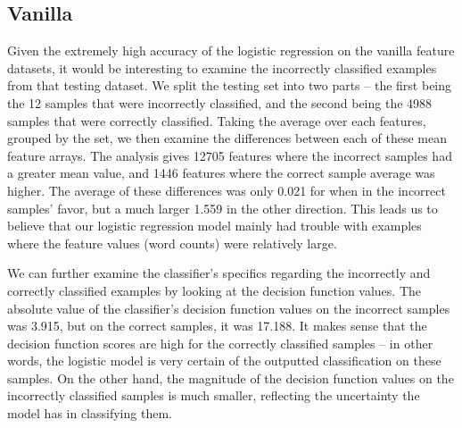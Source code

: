 \documentclass{article} %
\begin{document}
\subsection{Vanilla}
Given the extremely high accuracy of the logistic regression on the vanilla feature datasets, it would be interesting to examine the incorrectly classified examples from that testing dataset.  We split the testing set into two parts -- the first being the 12 samples that were incorrectly classified, and the second being the 4988 samples that were correctly classified.  Taking the average over each features, grouped by the set, we then examine the differences between each of these mean feature arrays.  The analysis gives 12705 features where the incorrect samples had a greater mean value, and 1446 features where the correct sample average was higher.  The average of these differences was only 0.021 for when in the incorrect samples' favor, but a much larger 1.559 in the other direction.  This leads us to believe that our logistic regression model mainly had trouble with examples where the feature values (word counts) were relatively large.\par 
We can further examine the classifier's specifics regarding the incorrectly and correctly classified examples by looking at the decision function values.  The absolute value of the classifier's decision function values on the incorrect samples was 3.915, but on the correct samples, it was 17.188.  It makes sense that the decision function scores are high for the correctly classified samples -- in other words, the logistic model is very certain of the outputted classification on these samples.  On the other hand, the magnitude of the decision function values on the incorrectly classified samples is much smaller, reflecting the uncertainty the model has in classifying them.\par 
\end{document}
